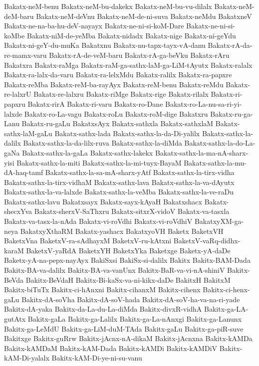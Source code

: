 {Bakatx-neM-benu
Bakatx-neM-bu-dakekx
Bakatx-neM-bu-vu-dilalx
Bakatx-neM-deM-baru
Bakatx-neM-deVnu
Bakatx-neM-de-ni-suva
Bakatx-neMdu
BakatxneV
Bakatx-ne-na-ba-hu-deV-nayayx
Bakatx-ne-ni-si-koM-Dare
Bakatx-ne-ni-si-koMbe
Bakatx-niM-de-yeMba
Bakatx-nidadx
Bakatx-nige
Bakatx-ni-geYdu
Bakatx-ni-geY-du-muKa
Bakatxnu
Bakatx-nu-tapx-tayx-vA-danu
Bakatx-rA-da-re-mamx-varu
Bakatx-rA-de-veM-baru
Bakatx-rA-ga-beVku
Bakatx-rAru
Bakatxra
Bakatx-raMga
Bakatx-raM-ga-sathx-laM-ga-LiM-tAyutx
Bakatx-ralalx
Bakatx-ra-lalx-da-varu
Bakatx-ra-lelxMdu
Bakatx-ralilx
Bakatx-ra-papxre
Bakatx-reMba
Bakatx-reM-ba-rayAyx
Bakatx-reM-benu
Bakatx-reMdu
Bakatx-re-lalxrU
Bakatx-re-lalxru
Bakatx-riMge
Bakatx-rige
Bakatx-rilalx
Bakatx-ri-papxru
Bakatx-rirA
Bakatx-ri-varu
Bakatx-ro-Dane
Bakatx-ro-La-nu-sa-ri-yi-lalxde
Bakatx-ro-La-vagu
Bakatx-roLu
Bakatx-roM-dige
Bakatxru
Bakatx-ru-ga-Lanu
Bakatx-ru-gaLu
BakatxsAyx
Bakatx-sathxla
Bakatx-sathxlaM
Bakatx-sathx-laM-gaLu
Bakatx-sathx-lada
Bakatx-sathx-la-da-Di-yalilx
Bakatx-sathx-la-dalilx
Bakatx-sathx-la-da-lilx-ruva
Bakatx-sathx-la-diMda
Bakatx-sathx-la-do-La-gaNa
Bakatx-sathx-la-gaLa
Bakatx-sathx-lakekx
Bakatx-sathx-la-ma-nA-sharx-yisi
Bakatx-sathx-la-miti
Bakatx-sathx-la-mi-tuyx-BayaM
Bakatx-sathx-la-mu-dA-haq-tamf
Bakatx-sathx-la-sa-mA-sharx-yAtf
Bakatx-sathx-la-tirx-vidha
Bakatx-sathx-la-tirx-vidhaM
Bakatx-sathx-lava
Bakatx-sathx-la-va-dAyutx
Bakatx-sathx-la-va-lalxde
Bakatx-sathx-la-veMba
Bakatx-sathx-la-ve-raDu
Bakatx-sathx-lavu
Bakatxsayx
Bakatx-sayx-kAyaH
Bakatxshacx
Bakatx-shecxYva
Bakatx-sherxV-SaThxru
Bakatx-sitxrX-vidoV
Bakatx-va-tasxla
Bakatx-va-tasx-la-nAda
Bakatx-vi-roVdhi
Bakatx-vi-roVdhiV
BakatxyXM-ga-neya
BakatxyXthaRM
Bakatx-yashacx
BakatxyoVH
Baketx
BaketxVH
BaketxVna
BaketxV-ra-sAdhayxM
BaketxV-ru-kAtxni
BaketxV-vaRq-didhx-karaM
BaketxV-yaRdA
BaketxYH
BaketxYka
Baketxge
Baketx-yA-daDe
Baketx-yA-na-pepx-nayAyx
BakiSxsi
BakiSx-si-dalilx
Bakitx
Bakitx-BAM-Dada
Bakitx-BA-va-dalilx
Bakitx-BA-va-vanUnx
Bakitx-BaR-va-vi-nA-shiniV
Bakitx-BeVda
Bakitx-BeVdaH
Bakitx-Bi-kaSx-va-ni-kikx-daDe
BakitxH
BakitxM
Bakitx-biTuTx
Bakitx-ci-hAnxni
Bakitx-cihanxM
Bakitx-cihenx
Bakitx-ci-henx-gaLu
Bakitx-dA-soVha
Bakitx-dA-soV-hada
Bakitx-dA-soV-ha-va-na-ri-yade
Bakitx-dA-yaka
Bakitx-da-La-du-La-diMda
Bakitx-divxR-vidhA
Bakitx-ga-LA-gutAtx
Bakitx-gaLa
Bakitx-ga-Lalilx
Bakitx-ga-La-nAnxgi
Bakitx-ga-Lanunx
Bakitx-ga-LeMdU
Bakitx-ga-LiM-duM-TAda
Bakitx-gaLu
Bakitx-ga-piR-suve
Bakitxge
Bakitx-guRrw
Bakitx-jAcnx-nA-dikaM
Bakitx-jAcnxna
Bakitx-kAMDa
Bakitx-kAMDaM
Bakitx-kAM-Dada
Bakitx-kAMDi
Bakitx-kAMDiV
Bakitx-kAM-Di-yalalx
Bakitx-kAM-Di-ye-ni-su-vanu
}
